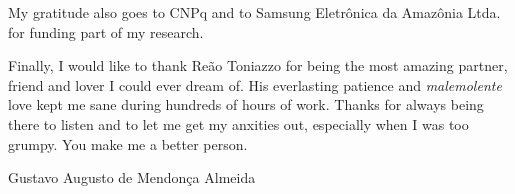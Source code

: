 \begin{acknowledgements}
\bigskip
My gratitude also goes to CNPq and to Samsung Eletr\^onica da Amaz\^onia Ltda. for funding part of my research.

\bigskip
Finally, I would like to thank Re\~ao Toniazzo for being the most amazing partner, friend and lover I could ever dream of. His everlasting patience and \emph{malemolente} love kept me sane during hundreds of hours of work. Thanks for always being there to listen and to let me get my anxities out, especially when I was too grumpy. You make me a better person. 

\bigskip
Gustavo Augusto de Mendon\c{c}a Almeida
\end{acknowledgements}
